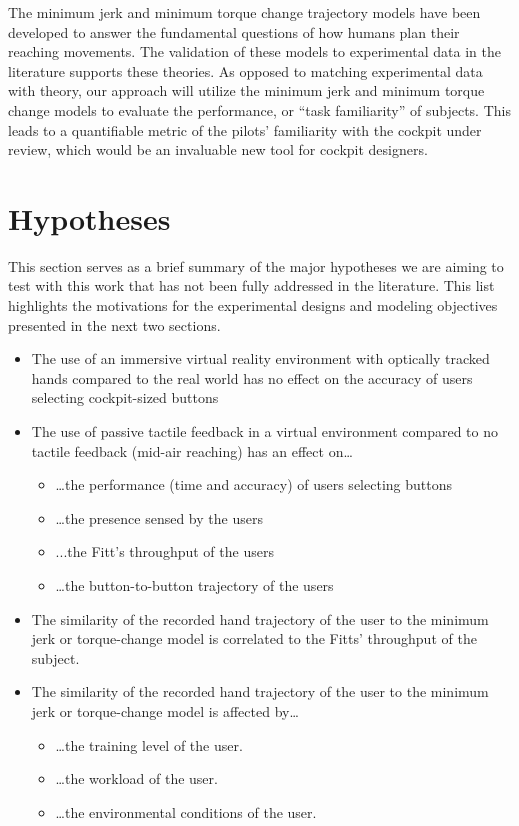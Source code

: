 The minimum jerk and minimum torque change trajectory models have been developed to answer the fundamental questions of how humans plan their reaching movements. The validation of these models to experimental data in the literature supports these theories. As opposed to matching experimental data with theory, our approach will utilize the minimum jerk and minimum torque change models to evaluate the performance, or ``task familiarity'' of subjects. This leads to a quantifiable metric of the pilots' familiarity with the cockpit under review, which would be an invaluable new tool for cockpit designers.

\section{Hypotheses}
\label{hypotheses}

This section serves as a brief summary of the major hypotheses we are aiming to test with this work that has not been fully addressed in the literature. This list highlights the motivations for the experimental designs and modeling objectives presented in the next two sections.

\begin{itemize}
\item
  The use of an immersive virtual reality environment with optically tracked hands compared to the real world has no effect on the accuracy of users selecting cockpit-sized buttons
\item
  The use of passive tactile feedback in a virtual environment compared to no tactile feedback (mid-air reaching) has an effect on\ldots{}
  \begin{itemize}
  \item \ldots{}the performance (time and accuracy) of users selecting buttons
  \item \ldots{}the presence sensed by the users
  \item ...the Fitt's throughput of the users
  \item \ldots{}the button-to-button trajectory of the users
  \end{itemize}
\item The similarity of the recorded hand trajectory of the user to the minimum jerk or torque-change model is correlated to the Fitts' throughput of the subject.
\item The similarity of the recorded hand trajectory of the user to the minimum jerk or torque-change model is affected by\ldots{}
  \begin{itemize}
  \item \ldots{}the training level of the user.
  \item \ldots{}the workload of the user.
  \item \ldots{}the environmental conditions of the user.
  \end{itemize}
\end{itemize}

